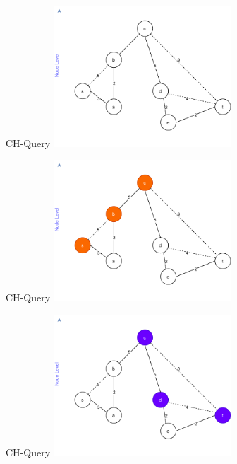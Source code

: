 \documentclass[8pt, t, aspectratio=169]{beamer}
\begin{document}
\begin{huge}
\begin{frame}{CH-Query}
  \centering
  \includegraphics[width=0.5\textwidth]{query1.pdf}
\end{frame}


\begin{frame}{CH-Query}
  \centering
  \includegraphics[width=0.5\textwidth]{query2.1.pdf}
\end{frame}

\begin{frame}{CH-Query}
  \centering
  \includegraphics[width=0.5\textwidth]{query2.2.pdf}
\end{frame}


\end{huge}
\end{document}
